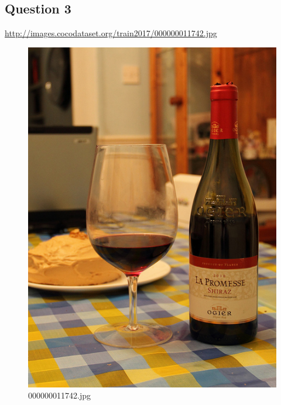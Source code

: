 \subsection*{Question 3}
\url{http://images.cocodataset.org/train2017/000000011742.jpg}
    \begin{figure}[h]
        \centering
        \includegraphics[width=0.8\linewidth]{../image set/easy/000000011742.jpg}
        \caption{000000011742.jpg}
    \end{figure}
